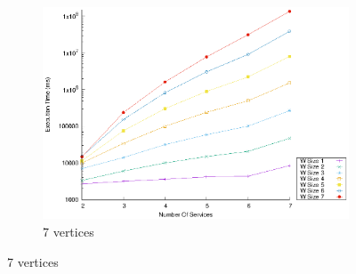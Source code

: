 \begin{figure}[!htb]
\begin{subfigure}{0.45\textwidth}
      \includegraphics[width=\textwidth]{Images/graphs/window_time_performance_qualitative_n7_s7_50_80_n7}
      \caption{7 vertices}
      \label{fig:time_window_perce_wide_7n}
    \end{subfigure}
    \label{fig:time_window_perce_average}
  \end{figure}
